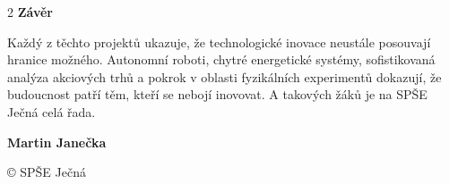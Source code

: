 \documentclass[final]{beamer}
\newcommand{\Heading}[1]{%
  \vspace{1em}%
  {\color{jecnaBlue}\bfseries\fontsize{56}{70}\selectfont #1}\par
  \vspace{0.8em}%
}
\begin{document}
\begin{frame}[t]
\begin{multicols}{2}
\Heading{Závěr}

Každý z těchto projektů ukazuje, že technologické inovace neustále posouvají hranice možného. Autonomní roboti, chytré energetické systémy, sofistikovaná analýza akciových trhů a pokrok v oblasti fyzikálních experimentů dokazují, že budoucnost patří těm, kteří se nebojí inovovat. A takových žáků je na SPŠE Ječná celá řada.

\vspace{2.2cm}
\hfill \Large\bfseries Martin Janečka

\end{multicols}

\vfill
\begin{center}
  \small © SPŠE Ječná \the\year
\end{center}

\end{frame}
\end{document}
